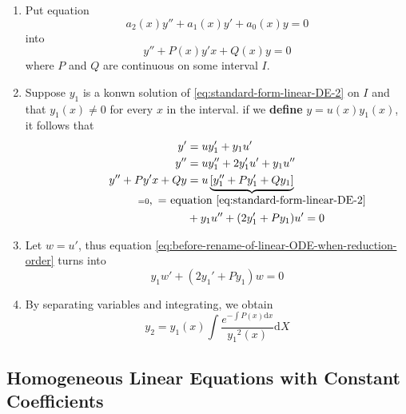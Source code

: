 \begin{enumerate}
    \item Put equation
        \[
            a_2(x)y'' + a_1(x) y' + a_0(x) y = 0
        \]
        into 
        \begin{equation}\label{eq:standard-form-linear-DE-2}
            y'' + P(x)y'x + Q(x)y = 0
        \end{equation}
        where $P$ and $Q$ are continuous on some interval $I$.
    \item Suppose $y_1$ is a konwn solution of \ref{eq:standard-form-linear-DE-2} on $I$
        and that $y_1(x) \neq 0$ for every $x$ in the interval.
        if we \textbf{define} $y = u(x)y_1(x)$, it follows that
        \begin{align}
            y'  &= u y'_1 + y_1 u' \notag\\
            y'' &= uy''_1 + 2y_1'u' + y_1 u'' \notag\\
            y'' + Py'x + Qy &= 
                u\underbrace{
                    \left[y_1'' + Py_1' + Qy_1\right]
                }_{\mathclap{
                    =0 \mbox{, \,= equation \ref{eq:standard-form-linear-DE-2}}
                }}\notag\\
                &+ y_1u'' + (2y_1' + Py_1) u' = 0 \label{eq:before-rename-of-linear-ODE-when-reduction-order}
        \end{align}
    \item Let $w = u'$, thus equation \ref{eq:before-rename-of-linear-ODE-when-reduction-order} turns into
        \[
            y_1w' + (2y_1' + Py_1) w = 0
        \]
    \item By separating variables and integrating, we obtain
        \begin{equation}\label{eq:another-sln-reduction-order}
            y_2 = y_1(x) \int \dfrac{e^{-\int P(x) \mathrm{d}x}}{{y_1}^2 (x)} \mathrm{d}X
        \end{equation}
\end{enumerate}

\subsection{Homogeneous Linear Equations with Constant Coefficients}
\label{homogeneous-linear-equations-with-constant-coefficients}

